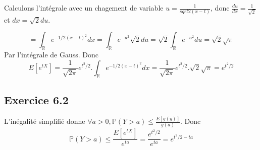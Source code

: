 \documentclass[]{book}
\theoremstyle{definition}
\newcommand{\bb}[1]{\mathbb{#1}}
\newcommand{\R}{\bb{R}}
\newcommand{\Pe}{\bb{P}}
\begin{document}
Calculons l'int\'egrale avec un chagement de variable $u=\frac{1}{sqrt{2}(x-t)}$, donc $\frac{du}{dx} = \frac{1}{\sqrt{2}}$ et $dx = \sqrt{2}du$.

$$
= \int_{\R}{e^{-1/2(x-t)^2}dx} = \int_{\R}{e^{-u^2}\sqrt{2}du} = \sqrt{2}\int_{\R}{e^{-u^2}du} = \sqrt{2}\sqrt{\pi}
$$
Par l'int\'egrale de Gauss.
Donc
$$
E[e^{tX}] = \frac{1}{\sqrt{2\pi}}e^{t^2/2}.\int_{\R}{e^{-1/2(x-t)^2}dx} = \frac{1}{\sqrt{2\pi}}e^{t^2/2}.\sqrt{2}\sqrt{\pi} = e^{t^2/2}
$$


\subsection*{Exercice 6.2}
L'in\'egalit\'e simplifi\'e donne $\forall a> 0 , \Pe(Y>a) \leq \frac{E[g(y)]}{g(a)}$. Donc
$$
\Pe(Y > a) \leq \frac{E[e^{tX}]}{e^{ta}} = \frac{e^{t^2/2}}{e^{ta}} = e^{t^2/2-ta}
$$
\end{document}
